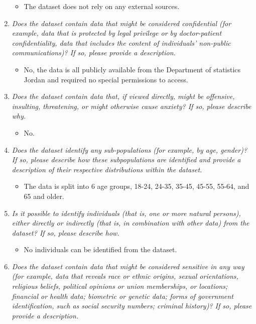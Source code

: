 \documentclass[
]{article}
\providecommand{\tightlist}{%
  \setlength{\itemsep}{0pt}\setlength{\parskip}{0pt}}
\begin{document}
\begin{enumerate}
  \begin{itemize}
  \tightlist
  \item
    The dataset does not rely on any external sources.
  \end{itemize}
\item
  \emph{Does the dataset contain data that might be considered
  confidential (for example, data that is protected by legal privilege
  or by doctor-patient confidentiality, data that includes the content
  of individuals' non-public communications)? If so, please provide a
  description.}

  \begin{itemize}
  \tightlist
  \item
    No, the data is all publicly available from the Department of
    statistics Jordan and required no special permissions to access.
  \end{itemize}
\item
  \emph{Does the dataset contain data that, if viewed directly, might be
  offensive, insulting, threatening, or might otherwise cause anxiety?
  If so, please describe why.}

  \begin{itemize}
  \tightlist
  \item
    No.
  \end{itemize}
\item
  \emph{Does the dataset identify any sub-populations (for example, by
  age, gender)? If so, please describe how these subpopulations are
  identified and provide a description of their respective distributions
  within the dataset.}

  \begin{itemize}
  \tightlist
  \item
    The data is split into 6 age groups, 18-24, 24-35, 35-45, 45-55,
    55-64, and 65 and older.
  \end{itemize}
\item
  \emph{Is it possible to identify individuals (that is, one or more
  natural persons), either directly or indirectly (that is, in
  combination with other data) from the dataset? If so, please describe
  how.}

  \begin{itemize}
  \tightlist
  \item
    No individuals can be identified from the dataset.
  \end{itemize}
\item
  \emph{Does the dataset contain data that might be considered sensitive
  in any way (for example, data that reveals race or ethnic origins,
  sexual orientations, religious beliefs, political opinions or union
  memberships, or locations; financial or health data; biometric or
  genetic data; forms of government identification, such as social
  security numbers; criminal history)? If so, please provide a
  description.}


\end{enumerate}
\end{document}
